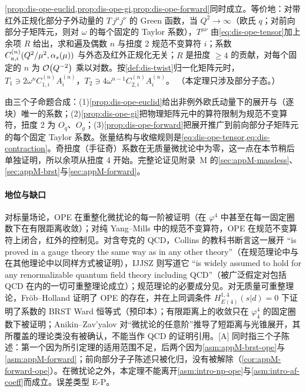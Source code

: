 \begin{theorem}\label{thm:dis-ope}
\cref{prop:dis-ope-euclid,prop:dis-ope-gi,prop:dis-ope-forward}同时成立。等价地：对带红外正规化部分子外动量的 $T\,j^\mu j^\nu$ 的 Green 函数，当 $Q^2\to\infty$（欧氏 $q$；对前向部分子矩阵元，则对 $\omega$ 的每个固定的 Taylor 系数），$T^{\mu\nu}$ 由\cref{eq:dis-ope-tensor}加上余项 $R$ 给出，求和遍及偶数 $n$ 与扭度 2 规范不变算符 $i$；系数 $C^{(n)}_{a,i}(Q^2/\mu^2,\alpha_s(\mu))$ 与外态及红外正规化无关；$R$ 是扭度 $\ge4$ 的贡献，对每个固定的 $n$ 为 $\mathcal{O}\!\left(Q^{-2}\right)$ 乘以对数。按\cref{def:dis-twist}归一化矩阵元时，$T_1\ni2\omega^nC^{(n)}_{1,i}A^{(n)}_i$，$T_2\ni4\omega^{n-1}C^{(n)}_{2,i}A^{(n)}_i$。%
（本定理只涉及部分子态。）
\end{theorem}

\begin{proofsketch}
由三个子命题合成：(1)\cref{prop:dis-ope-euclid}给出非例外欧氏动量下的展开与（逐块）唯一的系数；(2)\cref{prop:dis-ope-gi}把物理矩阵元中的算符限制为规范不变算符，扭度 2 为 $O_q$、$O_g$；(3)\cref{prop:dis-ope-forward}把展开推广到前向部分子矩阵元的每个固定 Taylor 系数。张量结构与收缩规则是\cref{eq:dis-ope-tensor,eq:dis-contraction}。奇扭度（手征奇）系数在无质量微扰论中为零，这一点在本节稍后单独证明，所以余项从扭度 4 开始。完整论证见附录~M 的\cref{sec:appM-massless}、\cref{sec:appM-brst}与\cref{sec:appM-forward}。
\end{proofsketch}

\paragraph{地位与缺口}
对标量场论，OPE 在重整化微扰论的每一阶被证明\cite{Zimmermann1973,Zimmermann:1972te,Zimmermann1970}（在 $\varphi^4$ 中甚至在每一固定圈数下在有限距离收敛\cite{Hollands:2011gf,Holland:2014pna}）；对纯 Yang--Mills 中的规范不变算符，OPE 在规范不变算符上闭合\cite{Hollands:2007zg}，红外的控制见\cite{Frob:2015uqy}。对含夸克的 QCD，Collins 的教科书断言这一展开 “is proved in a gauge theory the same way as in any other theory”\cite[第~12.8~节]{Collins1984}（在规范理论中与在其他理论中以同样方式被证明），IJJSZ 则写道它 “is widely assumed to hold for any renormalizable quantum field theory including QCD”\cite[第~II~节]{IzubuchiEtAl2018}（被广泛假定对包括 QCD 在内的一切可重整理论成立）；规范理论的必要成分见\cite{Joglekar:1976eb,Joglekar:1976pe}。对无质量可重整理论，Fröb--Holland 证明了 OPE 的存在，并在上同调条件 $H^{1,4}_{E(4)}(s|d)=0$ 下证明了系数的 BRST Ward 恒等式（预印本）\cite{Frob:2016mzv}；有限距离上的收敛只在 $\varphi^4_4$ 的固定圈数下被证明；Anikin--Zav'yalov 对“微扰论的任意阶”推导了短距离与光锥展开\cite{Anikin:1978tj}，其所覆盖的理论类没有被确认，不能当作 QCD 的证明引用。[A] 同时指三个子陈述：第一个因为所引定理的适用范围不足，后两个因为\cref{asm:appM-brst-ope}与\cref{asm:appM-forward}；前向部分子子陈述只被化归，没有被解除（\cref{cor:appM-forward-ope}）。在微扰论之外，本定理不能离开\cref{asm:intro-np-ope}与\cref{asm:intro-af-coeff}而成立。误差类型 E-P。

